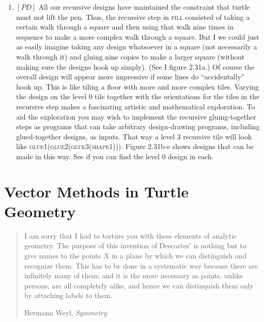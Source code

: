 \documentclass{book}
\begin{document}
\begin{enumerate}
\item $[PD]$ All our recursive designs have maintained the constraint that
turtle must not lift the pen. Thus, the recursive step in \textsc{fill} consisted
of taking a certain walk through a square and then using that walk nine
times in sequence to make a more complex walk through a square. But
I we could just as easily imagine taking any design whatsoever in a square
(not necessarily a walk through it) and gluing nine copies to make a
larger square (without making sure the designs hook up simply). (See
I figure 2.31a.) Of course the overall design will appear more impressive
if some lines do ``accidentally'' hook up. This is like tiling a floor
with more and more complex tiles. Varying the design on the level
0 tile together with the orientations for the tiles in the recursive step
makes a fascinating artistic and mathematical exploration. To aid the
exploration you may wish to implement the recursive gluing-together
steps as programs that can take arbitrary design-drawing programs,
including glued-together designs, as inputs. That way a level 3 recursive
tile will look like \textsc{glue1(glue2(glue3(shape1)))}. Figure 2.31b-e shows
designs that can be made in this way. See if you can find the level 0
design in each.
\end{enumerate}

\chapter{Vector Methods in Turtle Geometry}
\begin{quote}
I am sorry that I had to torture you with these
elements of analytic geometry. The purpose of this
invention of Descartes' is nothing but to give names
to the points $X$ in a plane by which we can distinguish and recognize them. This has to be done in a
systematic way because there are infinitely many of
them; and it is the more necessary as points, unlike
persons, are all completely alike, and hence we can
distinquish them only by attaching labels to them.

Hermann Weyl, {\em Symmetry}
\end{quote}
\end{document}
